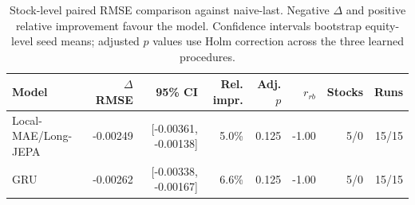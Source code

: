 \begin{table}[t]
\centering
\small
\caption{Stock-level paired RMSE comparison against naive-last. Negative $\Delta$ and positive relative improvement favour the model. Confidence intervals bootstrap equity-level seed means; adjusted $p$ values use Holm correction across the three learned procedures.}
\label{tab:paired_rmse_naive}
\begin{tabular}{lrrrrrrr}
\toprule
Model & $\Delta$RMSE & 95\% CI & Rel. impr. & Adj. $p$ & $r_{rb}$ & Stocks & Runs \\
\midrule
Local-MAE/Long-JEPA & -0.00249 & [-0.00361, -0.00138] & 5.0\% & 0.125 & -1.00 & 5/0 & 15/15 \\
GRU & -0.00262 & [-0.00338, -0.00167] & 6.6\% & 0.125 & -1.00 & 5/0 & 15/15 \\
\bottomrule
\end{tabular}
\end{table}
